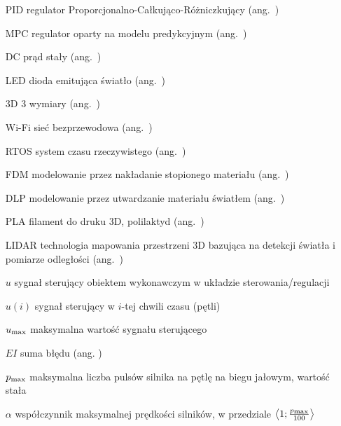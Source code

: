 \begin{itemize}
\item[PID] regulator Proporcjonalno-Całkująco-Różniczkujący (ang.~)
\item[MPC] regulator oparty na modelu predykcyjnym (ang.~)
\item[DC] prąd stały (ang.~)
\item[LED] dioda emitująca światło (ang.~)
\item[3D] 3 wymiary (ang.~)
\item[Wi-Fi] sieć bezprzewodowa (ang.~)
\item[RTOS] system czasu rzeczywistego (ang.~)
\item[FDM] modelowanie przez nakładanie stopionego materiału (ang.~)
\item[DLP] modelowanie przez utwardzanie materiału światłem (ang.~)
\item[PLA] filament do druku 3D, polilaktyd (ang.~)
\item[LIDAR] technologia mapowania przestrzeni 3D bazująca na detekcji światła i pomiarze odległości (ang.~)
\item[$u$] sygnał sterujący obiektem wykonawczym w układzie sterowania/regulacji
\item[$u(i)$] sygnał sterujący w $i$-tej chwili czasu (pętli)
\item[$u\textsubscript{max}$] maksymalna wartość sygnału sterującego
\item[$EI$] suma błędu (ang. )
\item[$p\textsubscript{max}$] maksymalna liczba pulsów silnika na pętlę na biegu jałowym, wartość stała
\item[$\alpha$] współczynnik maksymalnej prędkości silników, w przedziale $\left<1; \frac{p\textsubscript{max}}{100}\right>$ 
\end{itemize}